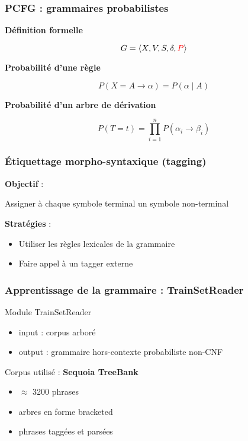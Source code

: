 \documentclass{beamer}
\begin{document}
\begin{frame}
\frametitle{PCFG : grammaires probabilistes}
\pause
\textbf{D\'efinition formelle}

$$G = \left< X, V, S, \delta, \textcolor{red}{P} \right>$$

\pause
\textbf{Probabilit\'e d'une r\`egle}

$$P(X = A \rightarrow \alpha) = P(\alpha \mid A)$$

\pause
\textbf{Probabilit\'e d'un arbre de d\'erivation}

$$P(T = t) = \prod_{i=1}^{n} P(\alpha_i \rightarrow \beta_i)$$

\end{frame}

\begin{frame}
\frametitle{\'Etiquettage morpho-syntaxique (tagging)}
\pause
\textbf{Objectif} :

\begin{center}Assigner \`a chaque symbole terminal un symbole non-terminal\end{center}

\vspace{1cm}

\pause
\textbf{Strat\'egies} :
\begin{itemize}
\pause
\item Utiliser les r\`egles lexicales de la grammaire
\pause
\item Faire appel \`a un tagger externe
\end{itemize}
\end{frame}

\begin{frame}
\frametitle{Apprentissage de la grammaire : TrainSetReader}
Module TrainSetReader
\begin{itemize}
  \item input : corpus arbor\'e
  \item output : grammaire hors-contexte probabiliste non-CNF
\end{itemize}

Corpus utilis\'e : \textbf{Sequoia TreeBank}
 \begin{itemize}
  \item $\approx$ 3200 phrases
  \item arbres en forme bracketed
  \item phrases tagg\'ees et pars\'ees
\end{itemize}
\end{frame}
\end{document}
